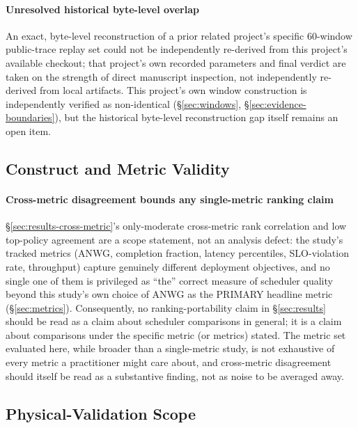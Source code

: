 \paragraph{Unresolved historical byte-level overlap} An exact, byte-level
reconstruction of a prior related project's specific 60-window public-trace
replay set could not be independently re-derived from this project's
available checkout; that project's own recorded parameters and final
verdict are taken on the strength of direct manuscript inspection, not
independently re-derived from local artifacts. This project's own window
construction is independently verified as non-identical
(\S\ref{sec:windows}, \S\ref{sec:evidence-boundaries}), but the historical
byte-level reconstruction gap itself remains an open item.

\subsection{Construct and Metric Validity}

\paragraph{Cross-metric disagreement bounds any single-metric ranking
claim} \S\ref{sec:results-cross-metric}'s only-moderate cross-metric rank
correlation and low top-policy agreement are a scope statement, not an
analysis defect: the study's tracked metrics (ANWG, completion fraction,
latency percentiles, SLO-violation rate, throughput) capture genuinely
different deployment objectives, and no single one of them is privileged
as ``the'' correct measure of scheduler quality beyond this study's own
choice of ANWG as the PRIMARY headline metric (\S\ref{sec:metrics}).
Consequently, no ranking-portability claim in \S\ref{sec:results} should
be read as a claim about scheduler comparisons in general; it is a claim
about comparisons under the specific metric (or metrics) stated. The
metric set evaluated here, while broader than a single-metric study, is
not exhaustive of every metric a practitioner might care about, and
cross-metric disagreement should itself be read as a substantive finding,
not as noise to be averaged away.

\subsection{Physical-Validation Scope}


